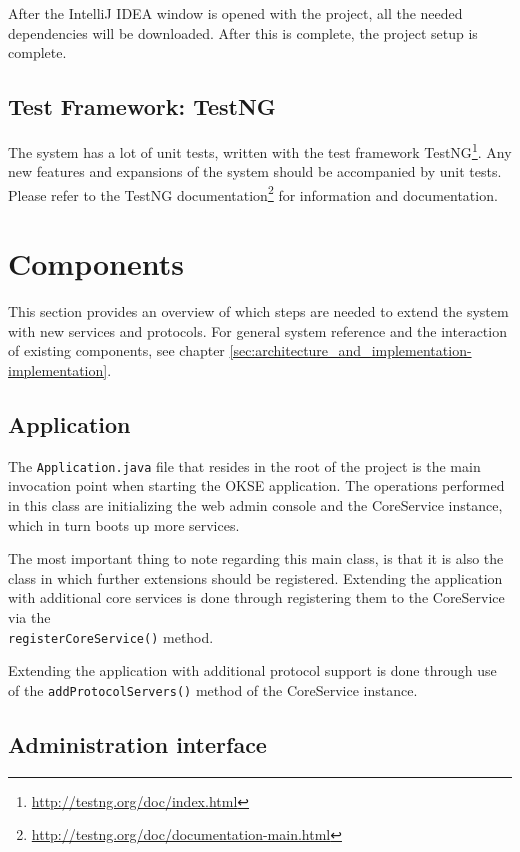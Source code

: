 After the IntelliJ IDEA window is opened with the project, all the needed dependencies will be downloaded. After this is complete, the project setup is complete.

\subsection{Test Framework: TestNG}
The system has a lot of unit tests, written with the test framework TestNG\footnote{\url{http://testng.org/doc/index.html}}. Any new features and expansions of the system should be accompanied by unit tests. Please refer to the TestNG documentation\footnote{\url{http://testng.org/doc/documentation-main.html}} for information and documentation.

\section{Components}
\label{sec:developer_manual-components}
This section provides an overview of which steps are needed to extend the system with new services and protocols. For general system reference and the interaction of existing components, see chapter \ref{sec:architecture_and_implementation-implementation}.

\subsection{Application}
\label{subsec:developer_manual-components-application}

The \verb!Application.java! file that resides in the root of the project is the main invocation point when starting the OKSE application. The operations performed in this class are initializing the web admin console and the CoreService instance, which in turn boots up more services.

The most important thing to note regarding this main class, is that it is also the class in which further extensions should be registered. Extending the application with additional core services is done through registering them to the CoreService via the \\\verb!registerCoreService()! method.

Extending the application with additional protocol support is done through use of the \verb!addProtocolServers()! method of the CoreService instance.

\subsection{Administration interface}
\label{subsec:administration_interface}

